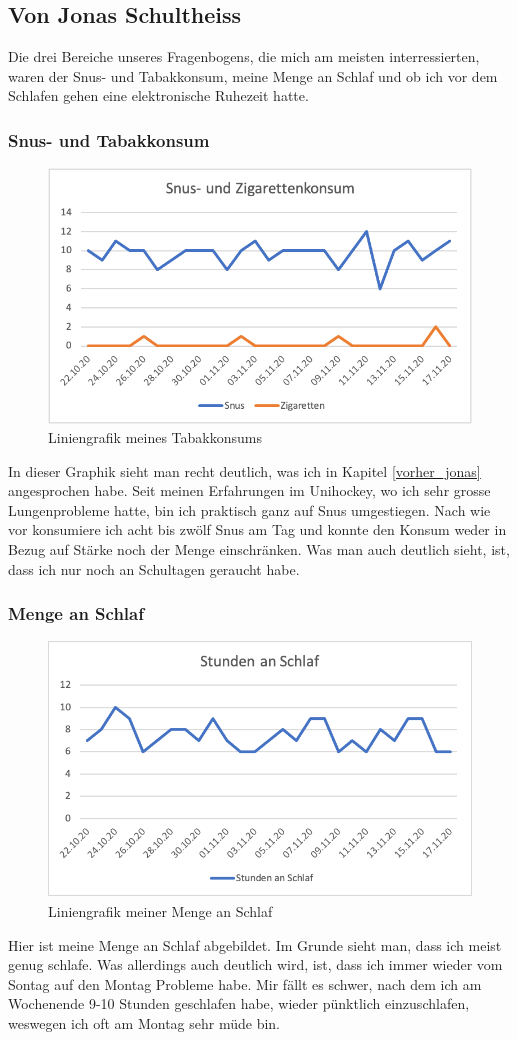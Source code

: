\subsection{Von Jonas Schultheiss}
\authortoc{\jonas}{\subsectionident}
Die drei Bereiche unseres Fragenbogens, die mich am meisten interressierten, waren der Snus- und Tabakkonsum, meine Menge an Schlaf und ob ich vor dem Schlafen gehen eine elektronische Ruhezeit hatte.
\subsubsection{Snus- und Tabakkonsum}
\begin{figure}[!ht]
  \centering
  \includegraphics[width=0.6\linewidth]{./images/tabak_jonas.png}
  \caption{Liniengrafik meines Tabakkonsums}
  \label{fig:tabak_jonas}
\end{figure}
In dieser Graphik sieht man recht deutlich, was ich in Kapitel \ref{vorher_jonas} angesprochen habe. Seit meinen Erfahrungen im Unihockey, wo ich sehr grosse Lungenprobleme hatte, bin ich praktisch ganz auf Snus umgestiegen. Nach wie vor konsumiere ich acht bis zwölf Snus am Tag und konnte den Konsum weder in Bezug auf Stärke noch der Menge einschränken. Was man auch deutlich sieht, ist, dass ich nur noch an Schultagen geraucht habe. 
\subsubsection{Menge an Schlaf}
\begin{figure}[!ht]
  \centering
  \includegraphics[width=0.6\linewidth]{./images/schlaf_jonas.png}
  \caption{Liniengrafik meiner Menge an Schlaf}
  \label{fig:schlaf_jonas}
\end{figure}
Hier ist meine Menge an Schlaf abgebildet. Im Grunde sieht man, dass ich meist genug schlafe. Was allerdings auch deutlich wird, ist, dass ich immer wieder vom Sontag auf den Montag Probleme habe. Mir fällt es schwer, nach dem ich am Wochenende 9-10 Stunden geschlafen habe, wieder pünktlich einzuschlafen, weswegen ich oft am Montag sehr müde bin.
